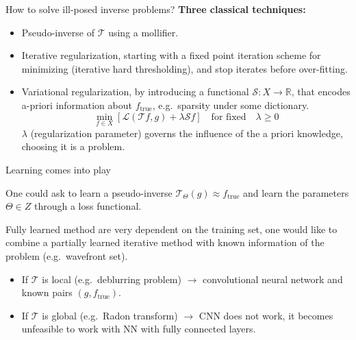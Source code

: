 \begin{frame}{How to solve ill-posed inverse problems?}
\textbf{Three classical techniques:}
\begin{itemize}
\item Pseudo-inverse of $\mathcal{T}$ using a mollifier.
\item Iterative regularization, starting with a fixed point iteration scheme for minimizing (iterative hard thresholding), and stop iterates before over-fitting.
\item Variational regularization, by introducing a functional $\mathcal{S}:X\longrightarrow \mathbb{R}$, that encodes a-priori information about $f_{\text{true}}$, e.g.\ sparsity under some dictionary.
$$
\min_{f\in X} [\mathcal{L}(\mathcal{T}f,g)+\lambda \mathcal{S}f] \quad \text{for fixed}\quad \lambda\geq 0
$$
$\lambda$ (regularization parameter) governs the influence of the a priori knowledge, choosing it is a problem.
\end{itemize}
\end{frame}

\begin{frame}{Learning comes into play}

One could ask to learn a pseudo-inverse $\mathcal{T}_{\Theta}(g)\approx f_{\text{true}}$ and learn the parameters $\Theta\in Z$ through a loss functional. 

\pause

\bigskip

Fully learned method are very dependent on the training set, one would like to combine a partially learned iterative method with known information of the problem (e.g.\ wavefront set).

\pause

\bigskip

\begin{itemize}
\item If $\mathcal{T}$ is local (e.g.\ deblurring problem) $\longrightarrow$ convolutional neural network and known pairs $(g,f_{\text{true}})$.
\item If $\mathcal{T}$ is global (e.g.\ Radon transform) $\longrightarrow$ CNN does not work, it becomes unfeasible to work with NN with fully connected layers.
\end{itemize}
\end{frame}

